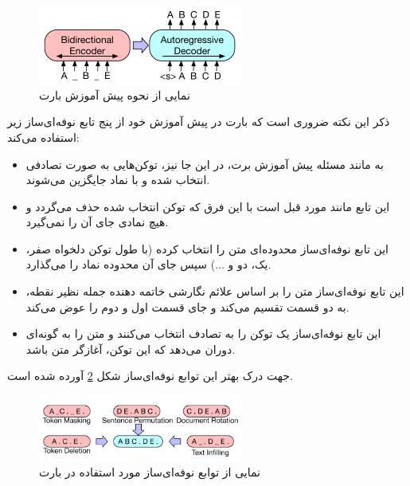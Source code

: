  \begin{figure}[h]
	\centering
	\includegraphics[width=0.6\textwidth]{images/chap3/bart_seq2seq.png}
	\caption[نمایی از نحوه پیش آموزش بارت]
	{
		نمایی از نحوه پیش آموزش بارت
		\cite{lewis2019bart}
	}
	\label{fig:chap3:bart_pretraining}
\end{figure}

ذکر این نکته ضروری است که بارت در پیش آموزش خود از پنج تابع نوفه‌ای‌ساز زیر استفاده می‌کند:

\begin{itemize}
	\item 
	\textbf{
}

به مانند مسئله پیش آموزش برت، در این جا نیز، توکن‌هایی به صورت تصادفی انتخاب شده و با نماد
\lr{\_}
جایگزین می‌شوند.

\item 
\textbf{
}

این تابع مانند مورد قبل است با این فرق که توکن انتخاب شده حذف می‌گردد و هیچ نمادی جای آن را نمی‌گیرد.

\item 
\textbf{
}

این تابع نوفه‌ای‌ساز محدوده‌ای متن را انتخاب کرده (با طول توکن‌ دلخواه صفر، یک، دو و ...) سپس جای آن محدوده نماد 
\lr{\_}
را می‌گذارد.

\item 
\textbf{
} 

	این تابع نوفه‌ای‌ساز متن را بر اساس علائم نگارشی خاتمه دهنده جمله نظیر نقطه، به دو قسمت تقسیم می‌کند و جای قسمت اول و دوم را عوض می‌کند.
\item 
\textbf{
} 	

این تابع نوفه‌ای‌ساز یک توکن را به تصادف انتخاب می‌کنند و متن را به گونه‌ای دوران می‌دهد که این توکن، آغازگر متن باشد.
\end{itemize}

جهت درک بهتر این توابع نوفه‌ای‌ساز شکل
\ref{fig:chap3:bart_noising_function}
آورده شده است.
 \begin{figure}[h]
	\centering
	\includegraphics[width=0.6\textwidth]{images/chap3/bart_noising_function.png}
	\caption[نمایی از توابع نوفه‌ای‌ساز مورد استفاده در بارت]
	{
		نمایی از توابع نوفه‌ای‌ساز مورد استفاده در بارت
		\cite{lewis2019bart}
	}
	\label{fig:chap3:bart_noising_function}
\end{figure}

